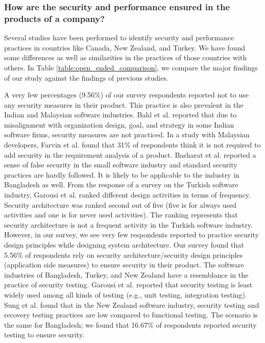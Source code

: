 \subsubsection{How are the security and performance ensured in the products of a company?}

Several studies have been performed to identify security and performance practices in countries like Canada, New Zealand, and Turkey. We have found some differences as well as similarities in the practices of those countries with others. In Table \ref{table:open_ended_comparison}, we compare the major findings of our study against the findings of previous studies.


\label{security_comparison}
A very few percentages (9.56\%) of our survey respondents reported not to use any security measures in their product. This practice is also prevalent in the Indian and Malaysian software industries. Bahl et al.\citep{Bahl2011} reported that due to misalignment with organization design, goal, and strategy in some Indian software firms, security measures are not practiced. In a study with Malaysian developers, Farvin et al.\citep{Farvin2016} found that 31\% of respondents think it is not required to add security in the requirement analysis of a product. Basharat et al.\citep{Basharat2013} reported a sense of false security in the small software industry and standard security practices are hardly followed. It is likely to be applicable to the industry in Bangladesh as well. From the response of a survey on the Turkish software industry, Garousi et al.\citep{Garousi2015} ranked different design activities in terms of frequency. Security architecture was ranked second out of five (five is for always used activities and one is for never used activities). The ranking represents that security architecture is not a frequent activity in the Turkish software industry. However, in our survey, we see very few respondents reported to practice security design principles while designing system architecture. Our survey found that 5.56\% of respondents rely on security architecture/security design principles (application side measures) to ensure security in their product. The software industries of Bangladesh, Turkey, and New Zealand have a resemblance in the practice of security testing. Garousi et al.\citep{Garousi2015} reported that security testing is least widely used among all kinds of testing (e.g., unit testing, integration testing). Sung et al.\citep{Sung2006} found that in the New Zealand software industry, security testing and recovery testing practices are low compared to functional testing. The scenario is the same for Bangladesh; we found that 16.67\% of respondents reported security testing to ensure security.


